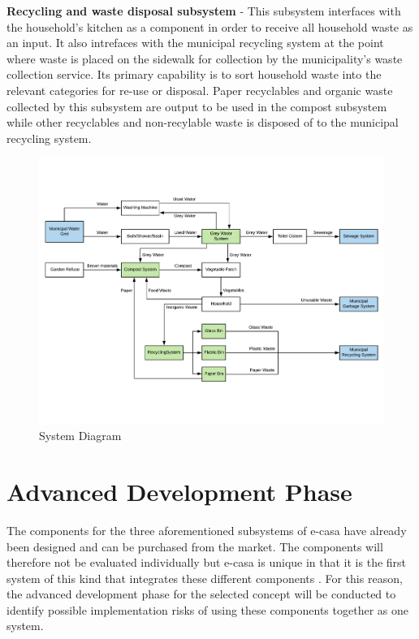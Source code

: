 \documentclass[a4paper,11pt,fleqn]{report}
\begin{document}
\textbf{Recycling and waste disposal subsystem} - This subsystem interfaces with the household's kitchen as a component in order to receive all household waste as an input. It also intrefaces with the municipal recycling system at the point where waste is placed on the sidewalk for collection by the municipality's waste collection service. Its primary capability is to sort household waste into the relevant categories for re-use or disposal. Paper recyclables and organic waste collected by this subsystem are output to be used in the compost subsystem while other recyclables and non-recylable waste is disposed of to the municipal recycling system.
%
\begin{figure}[h!]
\begin{center}
\includegraphics[scale = 0.55]{System_Diagram.pdf}
\caption{System Diagram}
\label{fig: systemDiagram}
\end{center}
\end{figure}
%
\section{Advanced Development Phase}
The components for the three aforementioned subsystems of \ac{e-casa} have already been designed and can be purchased from the market. The components will therefore not be evaluated individually but \ac{e-casa} is unique in that it is the first system of this kind that integrates these different components .
For this reason, the advanced development phase for the selected concept will be conducted to identify possible implementation risks of using these components together as one system.
\end{document}
